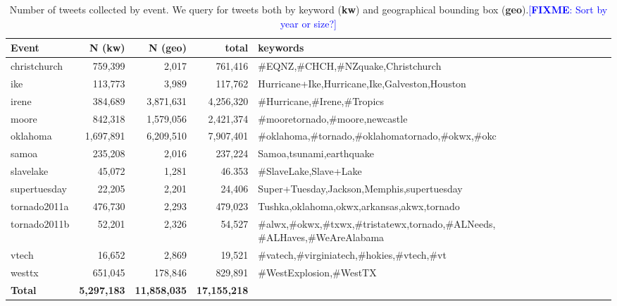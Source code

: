 \documentclass{article}
\newcommand{\FIXME}[1]{\textcolor{blue}{[\textbf{FIXME}: {#1}]}}
\begin{document}
\begin{table*}
\centering
\small
\begin{tabular}{|l|r|r|r| p{8cm} |}
\hline
{\bf Event}  & {\bf N (kw)} & {\bf N (geo)} & {\bf total} & {\bf keywords} \\
\hline
christchurch &  759,399  & 2,017       &  761,416    & \#EQNZ,\#CHCH,\#NZquake,Christchurch\\
ike          &  113,773  & 3,989       &  117,762    & Hurricane+Ike,Hurricane,Ike,Galveston,Houston\\
irene        &  384,689  & 3,871,631   &  4,256,320  & \#Hurricane,\#Irene,\#Tropics\\
moore        &  842,318  & 1,579,056   &  2,421,374  & \#mooretornado,\#moore,newcastle\\
oklahoma     & 1,697,891 & 6,209,510   &  7,907,401  & \#oklahoma,\#tornado,\#oklahomatornado,\#okwx,\#okc\\
samoa        & 235,208   &  2,016      &  237,224    &  Samoa,tsunami,earthquake\\
slavelake    & 45,072    &  1,281      &  46.353     & \#SlaveLake,Slave+Lake\\
supertuesday & 22,205    &  2,201      &  24,406     & Super+Tuesday,Jackson,Memphis,supertuesday\\
tornado2011a & 476,730   &  2,293      &  479,023    & Tushka,oklahoma,okwx,arkansas,akwx,tornado\\
tornado2011b & 52,201    &  2,326      &  54,527     & \#alwx,\#okwx,\#txwx,\#tristatewx,tornado,\mbox{\#ALNeeds}, \#ALHaves,\#WeAreAlabama\\
vtech        & 16,652    &  2,869      &  19,521     & \#vatech,\#virginiatech,\#hokies,\#vtech,\#vt\\
westtx       & 651,045   &  178,846    &  829,891    & \#WestExplosion,\#WestTX\\
\hline
{\bf Total}  & {\bf 5,297,183} & {\bf 11,858,035}  & {\bf 17,155,218}  &\\
\hline
\end{tabular}
\caption{Number of tweets collected by event. We query for tweets both by
  keyword ({\bf kw}) and geographical bounding box ({\bf geo}).\FIXME{Sort by
    year or size?}\label{tab.data_summary}}
\end{table*}
\end{document}
